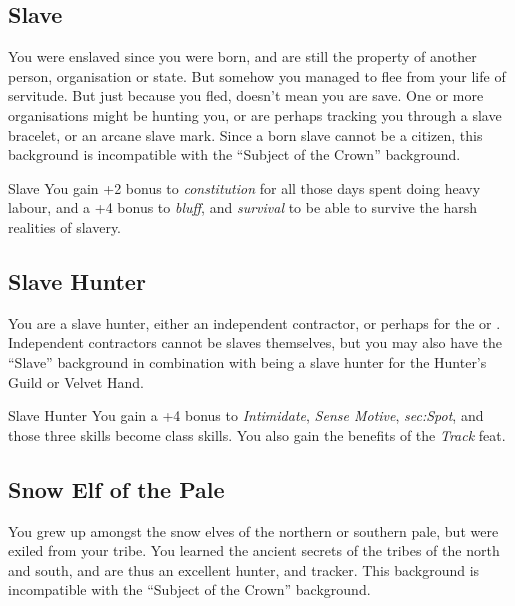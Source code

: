 \subsection{Slave}
\label{sec:background:Slave}

You were enslaved since you were born, and are still the property of another
person, organisation or state. But somehow you managed to flee from your life
of servitude. But just because you fled, doesn't mean you are save. One or
more organisations might be hunting you, or are perhaps tracking you through a
slave bracelet, or an arcane slave mark. Since a born slave cannot be a
citizen, this background is incompatible with the ``Subject of the Crown''
background.

\begin{35e}{Slave}
  You gain +2 bonus to \emph{constitution} for all those days spent doing
  heavy labour, and a +4 bonus to \emph{bluff}, and \emph{survival} to be able
  to survive the harsh realities of slavery.
\end{35e}

\subsection{Slave Hunter}
\label{sec:Slave Hunter}

You are a slave hunter, either an independent contractor, or perhaps for the
 or . Independent
contractors cannot be slaves themselves, but you may also have the ``Slave''
background in combination with being a slave hunter for the Hunter's Guild or
Velvet Hand.

\begin{35e}{Slave Hunter}
  You gain a +4 bonus to \emph{Intimidate}, \emph{Sense Motive},
  \emph{sec:Spot}, and those three skills become class skills. You also gain
  the benefits of the \emph{Track} feat.
\end{35e}

\subsection{Snow Elf of the Pale}
\label{sec:background:Snow Elf}

You grew up amongst the snow elves of the northern or southern pale, but were
exiled from your tribe. You learned the ancient secrets of the tribes of the
north and south, and are thus an excellent hunter, and tracker. This
background is incompatible with the ``Subject of the Crown'' background.

